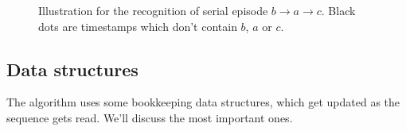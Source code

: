 \begin{figure}

\caption{Illustration for the recognition of serial episode $ b \to a \to c $. Black dots are timestamps which don't contain $ b $, $ a $ or $ c $.}
\label{fig:serial-recognition}
\end{figure}

\subsection{Data structures}

The algorithm uses some bookkeeping data structures, which get updated as the sequence gets read. We'll discuss the most important ones.
